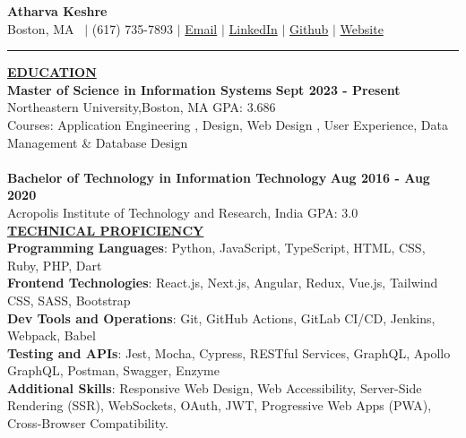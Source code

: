 \documentclass{article}
\begin{document}
\begin{center}
\thispagestyle{empty}
\large \textbf{\textbf{Atharva Keshre}  \\}
\normalsize  Boston, MA   $\mid$ (617) 735-7893 $\mid$ \href{mailto:keshre.a@northeastern.edu}{Email} $\mid$ \href{https://www.linkedin.com/in/atharva-keshre}{LinkedIn} $\mid$  \href{https://github.com/AtharvaKeshre}{Github} $\mid$  \href{https://atharvakeshre08.wixsite.com/website}{Website}  \\
\rule{\textwidth}{1pt}
\end{center}

\noindent \textbf{\underline{EDUCATION}} \\
\textbf{Master of Science in Information Systems} \hfill \textbf{Sept 2023 - Present } \\
Northeastern University,Boston, MA {GPA: 3.686}\\
Courses: Application Engineering , Design, Web Design , User Experience, Data Management \& Database Design\\\\
\textbf{Bachelor of Technology in Information Technology} \hfill \textbf{Aug 2016 - Aug 2020 } \\
Acropolis Institute of Technology and Research, India {GPA: 3.0} \\


\noindent \textbf{\underline{TECHNICAL PROFICIENCY}} \\
\textbf{Programming Languages}: Python, JavaScript, TypeScript, HTML, CSS, Ruby, PHP, Dart \\
\textbf{Frontend Technologies}: React.js, Next.js, Angular, Redux, Vue.js, Tailwind CSS, SASS, Bootstrap \\
\textbf{Dev Tools and Operations}: Git, GitHub Actions, GitLab CI/CD, Jenkins, Webpack, Babel \\
\textbf{Testing and APIs}: Jest, Mocha, Cypress, RESTful Services, GraphQL, Apollo GraphQL, Postman, Swagger, Enzyme \\
\textbf{Additional Skills}: Responsive Web Design, Web Accessibility, Server-Side Rendering (SSR), WebSockets, OAuth, JWT, Progressive Web Apps (PWA), Cross-Browser Compatibility.\\
\end{document}
